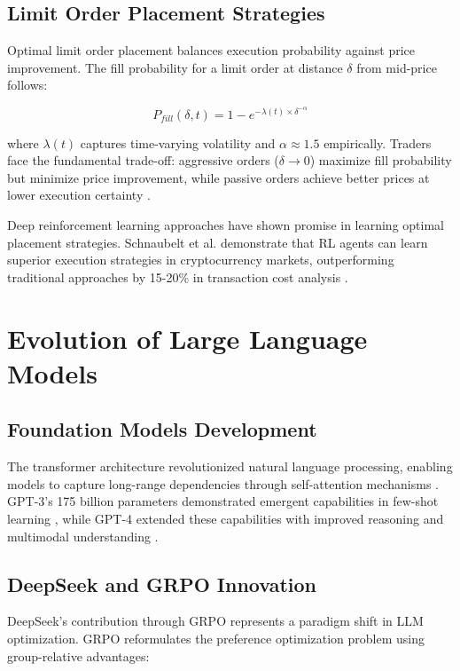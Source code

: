 \documentclass{report}
\begin{document}
\subsection{Limit Order Placement Strategies}

Optimal limit order placement balances execution probability against price improvement. The fill probability for a limit order at distance $\delta$ from mid-price follows:

\begin{equation}
P_{fill}(\delta, t) = 1 - e^{-\lambda(t) \times \delta^{-\alpha}}
\end{equation}

where $\lambda(t)$ captures time-varying volatility and $\alpha \approx 1.5$ empirically. Traders face the fundamental trade-off: aggressive orders ($\delta \rightarrow 0$) maximize fill probability but minimize price improvement, while passive orders achieve better prices at lower execution certainty \cite{Glosten1994, Harris2003}.

Deep reinforcement learning approaches have shown promise in learning optimal placement strategies. Schnaubelt et al. demonstrate that RL agents can learn superior execution strategies in cryptocurrency markets, outperforming traditional approaches by 15-20\% in transaction cost analysis \cite{Schnaubelt2022}.

\section{Evolution of Large Language Models}

\subsection{Foundation Models Development}

The transformer architecture revolutionized natural language processing, enabling models to capture long-range dependencies through self-attention mechanisms \cite{Vaswani2017}. GPT-3's 175 billion parameters demonstrated emergent capabilities in few-shot learning \cite{Brown2020}, while GPT-4 extended these capabilities with improved reasoning and multimodal understanding \cite{OpenAI2023}.

\subsection{DeepSeek and GRPO Innovation}

DeepSeek's contribution through GRPO represents a paradigm shift in LLM optimization. GRPO reformulates the preference optimization problem using group-relative advantages:
\end{document}
